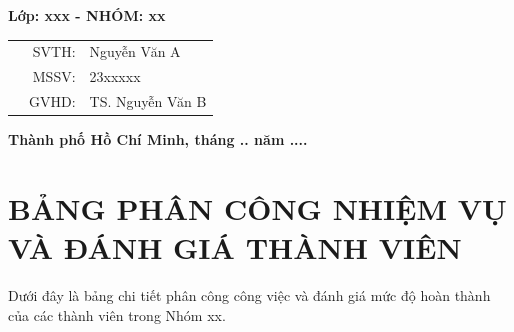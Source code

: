\documentclass[12pt, a4paper, oneside]{article}
\begin{document}
\begin{titlepage}
\begin{center}
    \vspace{15pt}
 \textbf{Lớp: xxx - NHÓM: xx}

\end{center}

\vspace{10pt}

\begin{table}[h]
\begin{tabular}{rrl}
\hspace{6 cm} & SVTH: &Nguyễn Văn A\\
& MSSV: &23xxxxx\\
& GVHD: &TS. Nguyễn Văn B
\end{tabular}
\end{table}





\vfill
\centerline{\bf Thành phố Hồ Chí Minh, tháng .. năm ....}

\vspace{1cm}
\end{titlepage}

\newpage
\section*{BẢNG PHÂN CÔNG NHIỆM VỤ VÀ ĐÁNH GIÁ THÀNH VIÊN}

Dưới đây là bảng chi tiết phân công công việc và đánh giá mức độ hoàn thành của các thành viên trong Nhóm xx.
\end{document}
